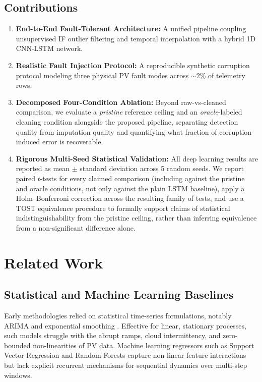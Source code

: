 \documentclass[conference]{IEEEtran}
\begin{document}
\subsection*{Contributions}
\begin{enumerate}
    \item \textbf{End-to-End Fault-Tolerant Architecture:} A unified pipeline coupling unsupervised IF outlier filtering and temporal interpolation with a hybrid 1D CNN-LSTM network.
    \item \textbf{Realistic Fault Injection Protocol:} A reproducible synthetic corruption protocol modeling three physical PV fault modes across $\sim$2\% of telemetry rows.
    \item \textbf{Decomposed Four-Condition Ablation:} Beyond raw-vs-cleaned comparison, we evaluate a \emph{pristine} reference ceiling and an \emph{oracle}-labeled cleaning condition alongside the proposed pipeline, separating detection quality from imputation quality and quantifying what fraction of corruption-induced error is recoverable.
    \item \textbf{Rigorous Multi-Seed Statistical Validation:} All deep learning results are reported as mean $\pm$ standard deviation across 5 random seeds. We report paired $t$-tests for every claimed comparison (including against the pristine and oracle conditions, not only against the plain LSTM baseline), apply a Holm--Bonferroni correction across the resulting family of tests, and use a TOST equivalence procedure to formally support claims of statistical indistinguishability from the pristine ceiling, rather than inferring equivalence from a non-significant difference alone.
\end{enumerate}

\section{Related Work}

\subsection{Statistical and Machine Learning Baselines}
Early methodologies relied on statistical time-series formulations, notably ARIMA and exponential smoothing \cite{sobri2018review, zhang2015baseline}. Effective for linear, stationary processes, such models struggle with the abrupt ramps, cloud intermittency, and zero-bounded non-linearities of PV data. Machine learning regressors such as Support Vector Regression and Random Forests capture non-linear feature interactions \cite{abumohsen2024hybrid} but lack explicit recurrent mechanisms for sequential dynamics over multi-step windows.
\end{document}
